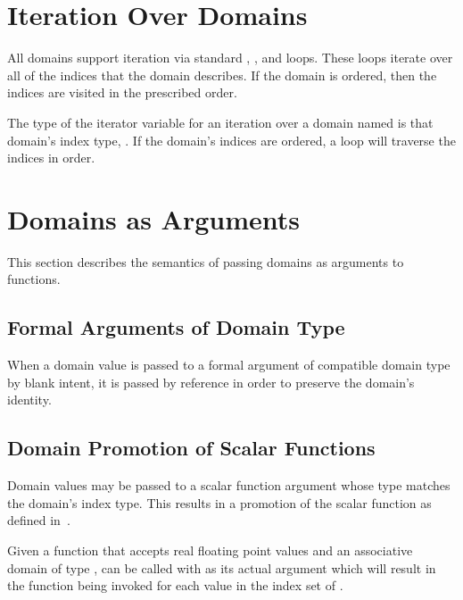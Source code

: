 \section{Iteration Over Domains}
\label{Iteration_over_Domains}

All domains support iteration via standard , , and 
loops.  These loops iterate over all of the indices that the domain
describes.  If the domain is ordered, then the indices are visited in the
prescribed order.  

The type of the iterator variable for an iteration over a
domain named  is that domain's index type, .
If the domain's indices are ordered, a  loop will traverse the
indices in order.


\section{Domains as Arguments}
\label{Domain_Arguments}

This section describes the semantics of passing domains as arguments
to functions.

\subsection{Formal Arguments of Domain Type}

When a domain value is passed to a formal argument of compatible
domain type by blank intent, it is passed by reference in order to
preserve the domain's identity.

\subsection{Domain Promotion of Scalar Functions}
\label{Domain_Promotion_of_Scalar_Functions}

Domain values may be passed to a scalar function argument whose type
matches the domain's index type.  This results in a promotion of the
scalar function as defined in~.

\begin{example}
Given a function  that accepts real floating point values
and an associative domain  of
type ,  can be called with  as
its actual argument which will result in the function being invoked
for each value in the index set of .
\end{example}

